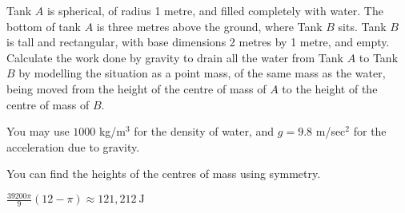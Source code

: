 \begin{question}\label{prob_s2.3tank1}
Tank $A$ is spherical, of radius 1 metre, and filled completely with water. The bottom of tank $A$ is three metres above the ground, where Tank $B$ sits. Tank $B$ is tall and rectangular, with base dimensions 2 metres by 1 metre, and empty. Calculate the work done by gravity to drain all the water from Tank $A$ to Tank $B$ by modelling the situation as a point mass, of the same mass as the water, being moved from the height of the centre of mass of $A$ to the height of the centre of mass of $B$.

\begin{center}
\end{center}
You may use $1000$ kg/m$^3$ for the density of water, and $g=9.8$ m/sec$^2$ for the acceleration due to gravity.
\end{question}
\begin{hint}
You can find the heights of the centres of mass using symmetry.
\end{hint}
\begin{answer}
$\displaystyle\frac{39200\pi}{9}(12-\pi)\approx 121,212~\text{J}$
\end{answer}
